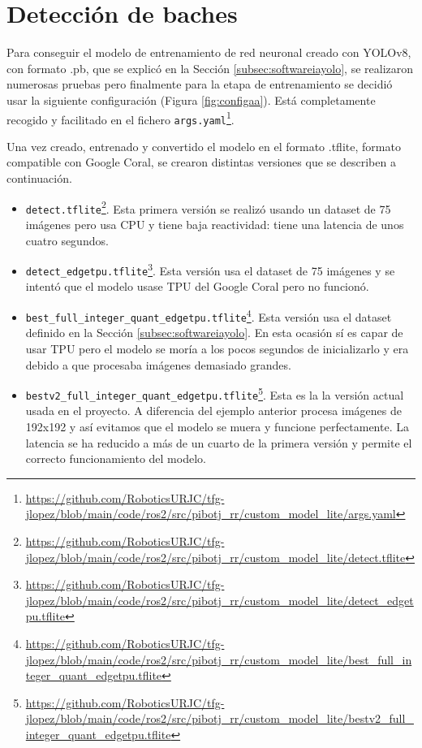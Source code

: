 \section{Detección de baches}
\label{sec:expaa}

Para conseguir el modelo de entrenamiento de red neuronal creado con YOLOv8, con formato .pb, que se explicó en la Sección \ref{subsec:softwareiayolo}, se realizaron numerosas pruebas pero finalmente para la etapa de entrenamiento se decidió usar la siguiente configuración (Figura \ref{fig:configaa}). Está completamente recogido y facilitado en el fichero \verb|args.yaml|\footnote{\url{https://github.com/RoboticsURJC/tfg-jlopez/blob/main/code/ros2/src/pibotj_rr/custom_model_lite/args.yaml}}.



Una vez creado, entrenado y convertido el modelo en el formato .tflite, formato compatible con Google Coral, se crearon distintas versiones que se describen a continuación.  
\begin{itemize}
	\item \verb|detect.tflite|\footnote{\url{https://github.com/RoboticsURJC/tfg-jlopez/blob/main/code/ros2/src/pibotj_rr/custom_model_lite/detect.tflite}}. Esta primera versión se realizó usando un dataset de 75 imágenes pero usa CPU y tiene baja reactividad: tiene una latencia de unos cuatro segundos.
	\item \verb|detect_edgetpu.tflite|\footnote{\url{https://github.com/RoboticsURJC/tfg-jlopez/blob/main/code/ros2/src/pibotj_rr/custom_model_lite/detect_edgetpu.tflite}}. Esta versión usa el dataset de 75 imágenes y se intentó que el modelo usase \ac{TPU} del Google Coral pero no funcionó.
	\item \verb|best_full_integer_quant_edgetpu.tflite|\footnote{\url{https://github.com/RoboticsURJC/tfg-jlopez/blob/main/code/ros2/src/pibotj_rr/custom_model_lite/best_full_integer_quant_edgetpu.tflite}}. Esta versión usa el dataset definido en la Sección \ref{subsec:softwareiayolo}. En esta ocasión sí es capar de usar \acs{TPU} pero el modelo se moría a los pocos segundos de inicializarlo y era debido a que procesaba imágenes demasiado grandes.
	\item \verb|bestv2_full_integer_quant_edgetpu.tflite|\footnote{\url{https://github.com/RoboticsURJC/tfg-jlopez/blob/main/code/ros2/src/pibotj_rr/custom_model_lite/bestv2_full_integer_quant_edgetpu.tflite}}. Esta es la la versión actual usada en el proyecto. A diferencia del ejemplo anterior procesa imágenes de 192x192 y así evitamos que el modelo se muera y funcione perfectamente. La latencia se ha reducido a más de un cuarto de la primera versión y permite el correcto funcionamiento del modelo.	
\end{itemize}


